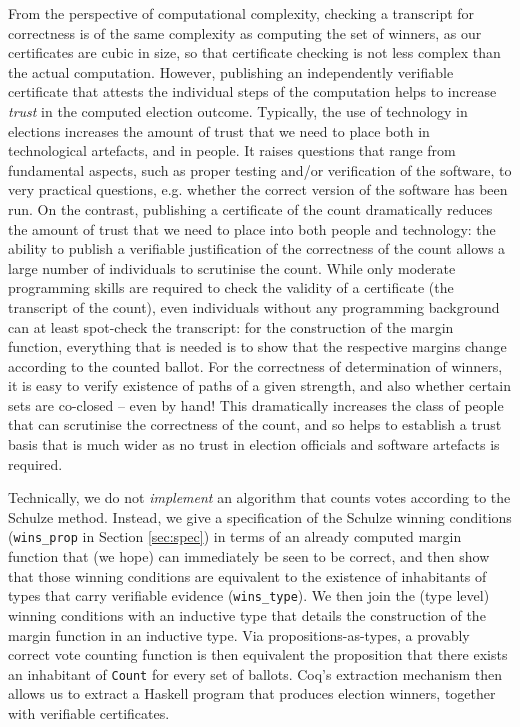 From the perspective of computational complexity, checking a
transcript for correctness is of the same complexity as computing
the set of winners, as our certificates are cubic in size, so that
certificate checking is not less complex than the actual
computation. 
However, publishing an independently verifiable certificate that
attests the individual steps of the computation helps to increase
\emph{trust} in the computed election outcome. Typically, the use of technology in
elections increases the amount of trust that we need to place both
in technological artefacts, and in people. It raises questions that
range from fundamental aspects, such as proper testing and/or
verification of the software, to very practical questions, e.g.
whether the correct version of the software has been run.  On the
contrast, publishing a certificate of the count dramatically reduces
the amount of trust that we need to place into both people and
technology: the ability to publish a verifiable justification of the
correctness of the count allows a large number of individuals to
scrutinise the count. While only moderate programming skills are
required to check the validity of a certificate (the transcript of
the count), even individuals without any programming background can
at least spot-check the transcript: for the construction of the
margin function, everything that is needed is to show that the
respective margins change according to the counted ballot. For the
correctness of determination of winners, it is easy to verify
existence of paths of a given strength, and also whether certain
sets are co-closed -- even by hand! This dramatically increases the
class of people that can scrutinise the correctness of the count,
and so helps to establish a trust basis that is much wider as no
trust in election officials and software artefacts is required.


Technically, we do not \emph{implement} an algorithm that counts
votes according to the Schulze method. Instead, we give a
specification of the Schulze winning conditions 
(\texttt{wins\_prop} in  Section \ref{sec:spec}) in terms of an
already computed margin function that
(we hope) can immediately be seen to be correct, and then show that those
winning conditions are equivalent to the existence of inhabitants of
types that carry verifiable evidence (\texttt{wins\_type}).  We then
join the (type level) winning conditions with an inductive type that
details the construction of the margin function in an inductive
type. Via propositions-as-types, a provably correct vote counting
function is then equivalent the proposition that there exists an
inhabitant of \texttt{Count} for every set of ballots.  Coq's
extraction mechanism then allows us to extract a Haskell program
that produces election winners, together with verifiable
certificates. 

